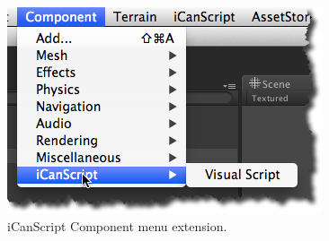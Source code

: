 \begin{figure}[htbp]
\centering
\includegraphics[keepaspectratio,width=\textwidth,height=0.75\textheight]{menu-component.png}
\caption{iCanScript Component menu extension.}
\label{menu-component.png}
\end{figure}

